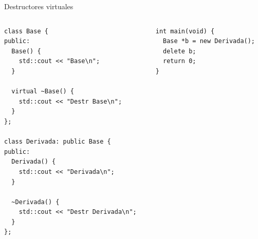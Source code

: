 \begin{frame}{Destructores virtuales}{}
   \begin{columns}[t]
      \begin{column}{.5\linewidth}
         \begin{lstlisting}[style=normal,firstnumber=1]
class Base {
public:
  Base() {
    std::cout << "Base\n";
  }

  virtual ~Base() {
    std::cout << "Destr Base\n";
  }
};

class Derivada: public Base {
public:
  Derivada() {
    std::cout << "Derivada\n";
  }

  ~Derivada() {
    std::cout << "Destr Derivada\n";
  }
};

         \end{lstlisting}
      \end{column}
      \begin{column}{.5\linewidth}
         \begin{lstlisting}[style=normal,firstnumber=23,linebackgroundcolor={%
                 \btLstHLB<1>{25}%
         }]
int main(void) { 
  Base *b = new Derivada();
  delete b;
  return 0;
}
         \end{lstlisting}

      \end{column}
   \end{columns}
\end{frame}

